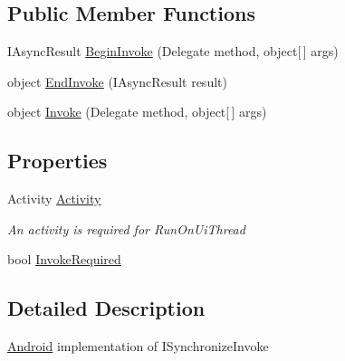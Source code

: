 \subsection*{Public Member Functions}
\begin{DoxyCompactItemize}
\item 
I\+Async\+Result \hyperlink{class_field_service_1_1_android_1_1_utilities_1_1_synchronize_invoke_a6ac7c9b337a03a802014ca0ed8b83423}{Begin\+Invoke} (Delegate method, object\mbox{[}$\,$\mbox{]} args)
\item 
object \hyperlink{class_field_service_1_1_android_1_1_utilities_1_1_synchronize_invoke_af4a1b944837edd6968661d0b851e2cd5}{End\+Invoke} (I\+Async\+Result result)
\item 
object \hyperlink{class_field_service_1_1_android_1_1_utilities_1_1_synchronize_invoke_a94197460f949ed01ed55b8d6422a7f55}{Invoke} (Delegate method, object\mbox{[}$\,$\mbox{]} args)
\end{DoxyCompactItemize}
\subsection*{Properties}
\begin{DoxyCompactItemize}
\item 
Activity \hyperlink{class_field_service_1_1_android_1_1_utilities_1_1_synchronize_invoke_afa656fe4db3f4908b0517c4d5a296eb1}{Activity}
\begin{DoxyCompactList}\small\item\em An activity is required for Run\+On\+Ui\+Thread \end{DoxyCompactList}\item 
bool \hyperlink{class_field_service_1_1_android_1_1_utilities_1_1_synchronize_invoke_afb4df6b060fa656a49632baf90eae27b}{Invoke\+Required}
\end{DoxyCompactItemize}


\subsection{Detailed Description}
\hyperlink{namespace_field_service_1_1_android}{Android} implementation of I\+Synchronize\+Invoke 



